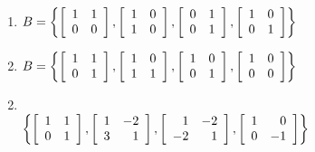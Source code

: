 \begin{multicols}{2}
\begin{ex}
\begin{enumerate}[leftmargin=1em,label={\alph*.}]
\item $B = \left\{
\left[ \begin{array}{rr}
1 & 1 \\
0 & 0
\end{array} \right]
,
\left[ \begin{array}{rr}
1 & 0 \\
1 & 0
\end{array} \right]
, 
\left[ \begin{array}{rr}
0 & 1 \\
0 & 1
\end{array} \right]
, 
\left[ \begin{array}{rr}
1 & 0 \\
0 & 1
\end{array} \right]
\right\}$

\item $B = \left\{
\left[ \begin{array}{rr}
1 & 1 \\
0 & 1
\end{array} \right]
,
\left[ \begin{array}{rr}
1 & 0 \\
1 & 1
\end{array} \right]
, 
\left[ \begin{array}{rr}
1 & 0 \\
0 & 1
\end{array} \right]
, 
\left[ \begin{array}{rr}
1 & 0 \\
0 & 0
\end{array} \right]
\right\}$

\end{enumerate}
\begin{sol}
\begin{enumerate}[label={\alph*.}]
\setcounter{enumi}{1}
\item \hspace{1em} \\
\hspace*{-2.5em}$
\left\{
\left[ \begin{array}{rr}
1 & 1 \\
0 & 1
\end{array} \right]
,
\left[ \begin{array}{rr}
1 & -2 \\
3 & 1
\end{array} \right]
, 
\left[ \begin{array}{rr}
1 & -2 \\
-2 & 1
\end{array} \right]
,
\left[ \begin{array}{rr}
1 & 0 \\
0 & -1
\end{array} \right]
\right\}$


\end{enumerate}
\end{sol}
\end{ex}
\end{multicols}
